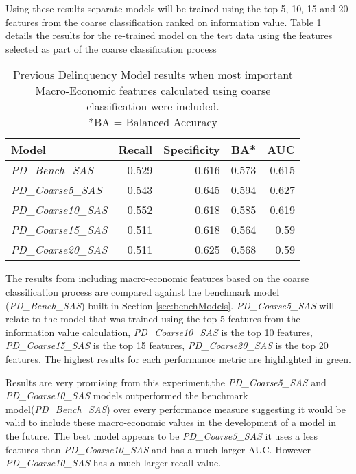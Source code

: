 Using these results separate models will be trained using the top 5, 10, 15 and 20 features from
the coarse classification ranked on information value. Table \ref{table:CoarsePDModelResults} details the results for the re-trained model
on the test data using the features selected as part of the coarse classification process

\begin{table}[H]
	\centering
	\small
	\begin{tabular}{l r r r r}
		\hline
		\textbf{Model} & \textbf{Recall} & \textbf{Specificity} & \textbf{BA*} & \textbf{AUC}  \\ \hline
		\textit{PD\_Bench\_SAS} & 0.529 & 0.616 & 0.573 & 0.615 \\ \hline
		\textit{PD\_Coarse5\_SAS}  & 0.543 & \cellcolor{green!25}0.645 & \cellcolor{green!25}0.594 & \cellcolor{green!25}0.627   \\ 
		\textit{PD\_Coarse10\_SAS} & \cellcolor{green!25}0.552 & 0.618 & 0.585 & 0.619  \\ 
		\textit{PD\_Coarse15\_SAS} & 0.511 & 0.618 & 0.564 & 0.59  \\
		\textit{PD\_Coarse20\_SAS} & 0.511 & 0.625 & 0.568 & 0.59  \\\hline 
	\end{tabular}
	\caption{Previous Delinquency Model results when most important\\
		Macro-Economic features calculated using coarse classification were included.
		\\ *BA = Balanced Accuracy}
	\label{table:CoarsePDModelResults}
\end{table}

The results from including macro-economic features based on the coarse classification process are compared against the benchmark model (\textit{PD\_Bench\_SAS}) built in Section \ref{sec:benchModels}. \textit{PD\_Coarse5\_SAS} will relate to the model that was trained using the top 5 features from the information value calculation, \textit{PD\_Coarse10\_SAS} is the top 10 features, \textit{PD\_Coarse15\_SAS} is the top 15 features, \textit{PD\_Coarse20\_SAS} is the top 20 features. The highest results for each performance metric are highlighted in green.

Results are very promising from this experiment,the \textit{PD\_Coarse5\_SAS} and \textit{PD\_Coarse10\_SAS} models outperformed the benchmark model(\textit{PD\_Bench\_SAS}) over every performance measure suggesting it would be valid to include these macro-economic values in the development of a model in the future. The best model appears to be \textit{PD\_Coarse5\_SAS} it uses a less features than \textit{\textit{PD\_Coarse10\_SAS}} and has a much larger AUC. However \textit{PD\_Coarse10\_SAS} has a much larger recall value. 

